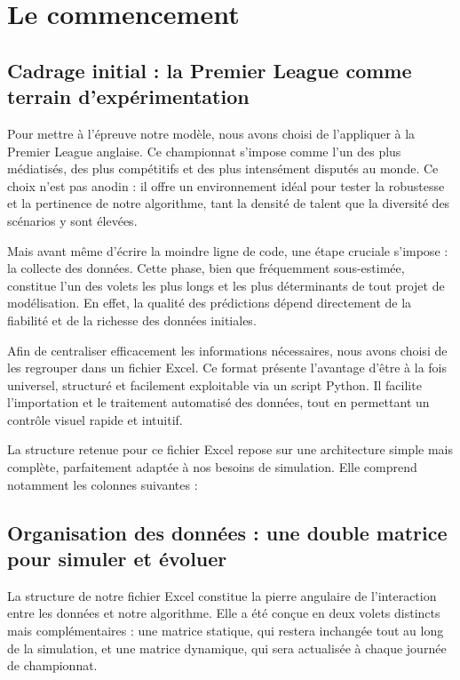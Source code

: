 \documentclass[12pt]{report}
\begin{document}
\chapter{Le commencement}


\section{Cadrage initial : la Premier League comme terrain d’expérimentation}

Pour mettre à l’épreuve notre modèle, nous avons choisi de l’appliquer à la Premier League anglaise. Ce championnat s’impose comme l’un des plus médiatisés, des plus compétitifs et des plus intensément disputés au monde. Ce choix n’est pas anodin : il offre un environnement idéal pour tester la robustesse et la pertinence de notre algorithme, tant la densité de talent que la diversité des scénarios y sont élevées.

Mais avant même d’écrire la moindre ligne de code, une étape cruciale s’impose : la collecte des données. Cette phase, bien que fréquemment sous-estimée, constitue l’un des volets les plus longs et les plus déterminants de tout projet de modélisation. En effet, la qualité des prédictions dépend directement de la fiabilité et de la richesse des données initiales.

Afin de centraliser efficacement les informations nécessaires, nous avons choisi de les regrouper dans un fichier Excel. Ce format présente l’avantage d’être à la fois universel, structuré et facilement exploitable via un script Python. Il facilite l’importation et le traitement automatisé des données, tout en permettant un contrôle visuel rapide et intuitif.

La structure retenue pour ce fichier Excel repose sur une architecture simple mais complète, parfaitement adaptée à nos besoins de simulation. Elle comprend notamment les colonnes suivantes :



\section{Organisation des données : une double matrice pour simuler et évoluer}

La structure de notre fichier Excel constitue la pierre angulaire de l’interaction entre les données et notre algorithme. Elle a été conçue en deux volets distincts mais complémentaires : une matrice statique, qui restera inchangée tout au long de la simulation, et une matrice dynamique, qui sera actualisée à chaque journée de championnat.
\end{document}
